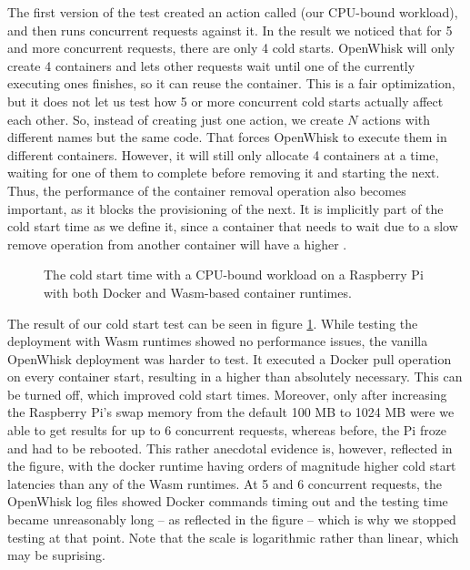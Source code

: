 The first version of the test created an action called  (our CPU-bound workload), and then runs concurrent requests against it. In the result we noticed that for 5 and more concurrent requests, there are only 4 cold starts. OpenWhisk will only create 4 containers and lets other requests wait until one of the currently executing ones finishes, so it can reuse the container. This is a fair optimization, but it does not let us test how 5 or more concurrent cold starts actually affect each other. So, instead of creating just one action, we create $N$ actions with different names but the same code. That forces OpenWhisk to execute them in different containers. However, it will still only allocate 4 containers at a time, waiting for one of them to complete before removing it and starting the next. Thus, the performance of the container removal operation also becomes important, as it blocks the provisioning of the next. It is implicitly part of the cold start time as we define it, since a container that needs to wait due to a slow remove operation from another container will have a higher .

\begin{figure}
    \begin{center}
        
    \end{center}
    \caption{The cold start time with a CPU-bound workload on a Raspberry Pi with both Docker and Wasm-based container runtimes.}
    \label{fig:pi-cold-start-hash}
\end{figure}

The result of our cold start test can be seen in figure \ref{fig:pi-cold-start-hash}. While testing the deployment with Wasm runtimes showed no performance issues, the vanilla OpenWhisk deployment was harder to test. It executed a Docker pull operation on every container start, resulting in a higher  than absolutely necessary. This can be turned off, which improved cold start times. Moreover, only after increasing the Raspberry Pi's swap memory from the default 100 MB to 1024 MB were we able to get results for up to 6 concurrent requests, whereas before, the Pi froze and had to be rebooted. This rather anecdotal evidence is, however, reflected in the figure, with the docker runtime having orders of magnitude higher cold start latencies than any of the Wasm runtimes. At 5 and 6 concurrent requests, the OpenWhisk log files showed Docker commands timing out and the testing time became unreasonably long -- as reflected in the figure -- which is why we stopped testing at that point. Note that the scale is logarithmic rather than linear, which may be suprising.

